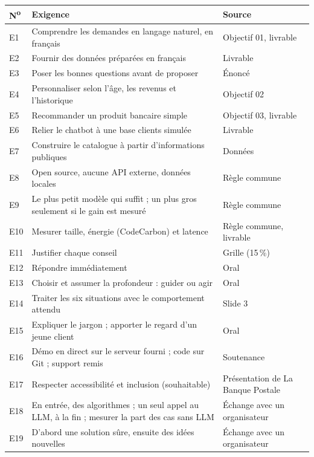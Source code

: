 \begin{center}\small
\begin{longtable}{@{}l L{8.6cm} L{4.4cm}@{}}
\toprule
\textbf{N\textsuperscript{o}} & \textbf{Exigence} & \textbf{Source} \\
\midrule
\endhead
E1 & Comprendre les demandes en langage naturel, en français & Objectif 01, livrable \\
E2 & Fournir des données préparées en français & Livrable \\
E3 & Poser les bonnes questions avant de proposer & Énoncé \\
E4 & Personnaliser selon l'âge, les revenus et l'historique & Objectif 02 \\
E5 & Recommander un produit bancaire simple & Objectif 03, livrable \\
E6 & Relier le chatbot à une base clients simulée & Livrable \\
E7 & Construire le catalogue à partir d'informations publiques & Données \\
E8 & Open source, aucune API externe, données locales & Règle commune \\
E9 & Le plus petit modèle qui suffit ; un plus gros seulement si le gain est mesuré & Règle commune \\
E10 & Mesurer taille, énergie (CodeCarbon) et latence & Règle commune, livrable \\
E11 & Justifier chaque conseil & Grille (15\,\%) \\
E12 & Répondre immédiatement & Oral \\
E13 & Choisir et assumer la profondeur : guider ou agir & Oral \\
E14 & Traiter les six situations avec le comportement attendu & Slide 3 \\
E15 & Expliquer le jargon ; apporter le regard d'un jeune client & Oral \\
E16 & Démo en direct sur le serveur fourni ; code sur Git ; support remis & Soutenance \\
E17 & Respecter accessibilité et inclusion (souhaitable) & Présentation de La Banque Postale \\
E18 & En entrée, des algorithmes ; un seul appel au LLM, à la fin ; mesurer la part des cas sans
  LLM & Échange avec un organisateur \\
E19 & D'abord une solution sûre, ensuite des idées nouvelles & Échange avec un organisateur \\
\bottomrule
\end{longtable}
\end{center}
